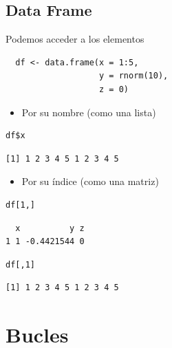 \documentclass[xcolor={usenames,svgnames,dvipsnames}]{beamer}
\begin{document}
\subsection{Data Frame}
\label{sec-3-5}
\begin{frame}[fragile,label=sec-3-5-1]{Podemos acceder a los elementos}
 \lstset{language=R,label= ,caption= ,numbers=none}
\begin{lstlisting}
  df <- data.frame(x = 1:5,
                   y = rnorm(10),
                   z = 0)
\end{lstlisting}

\begin{itemize}
\item Por su nombre (como una lista)
\end{itemize}
\lstset{language=R,label= ,caption= ,numbers=none}
\begin{lstlisting}
df$x
\end{lstlisting}

\begin{verbatim}
[1] 1 2 3 4 5 1 2 3 4 5
\end{verbatim}

\begin{itemize}
\item Por su índice (como una matriz)
\end{itemize}
\lstset{language=R,label= ,caption= ,numbers=none}
\begin{lstlisting}
df[1,]
\end{lstlisting}

\begin{verbatim}
  x          y z
1 1 -0.4421544 0
\end{verbatim}

\lstset{language=R,label= ,caption= ,numbers=none}
\begin{lstlisting}
df[,1]
\end{lstlisting}

\begin{verbatim}
[1] 1 2 3 4 5 1 2 3 4 5
\end{verbatim}
\end{frame}

\section{Bucles}
\label{sec-4}
\end{document}
